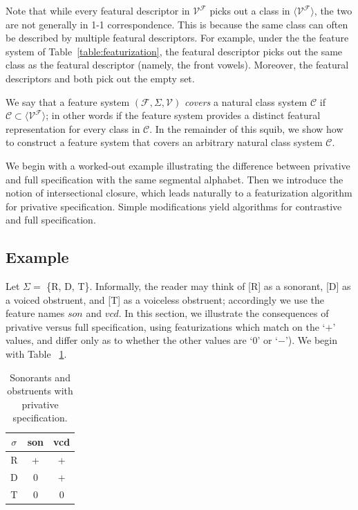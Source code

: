 \documentclass[11pt, oneside]{article}   	%
\begin{document}
Note that while every featural descriptor in $\mathcal V^\mathcal F$ picks out a class in $\langle \mathcal V^\mathcal F \rangle$, the two are not generally in 1-1 correspondence. This is because the same class can often be described by multiple featural descriptors. For example, under the the feature system of Table~\ref{table:featurization}, the featural descriptor  picks out the same class as the featural descriptor  (namely, the front vowels). Moreover, the featural descriptors  and  both pick out the empty set.

\vspace{\baselineskip} We say that a feature system $(\mathcal F, \Sigma, \mathcal V)$ \textit{covers} a natural class system $\mathcal C$ if $\mathcal C \subset \langle \mathcal V^\mathcal F \rangle$; in other words if the feature system provides a distinct featural representation for every class in $\mathcal C$. In the remainder of this squib, we show how to construct a feature system that covers an arbitrary natural class system $\mathcal C$.

We begin with a worked-out example illustrating the difference between privative and full specification with the same segmental alphabet. Then we introduce the notion of intersectional closure, which leads naturally to a featurization algorithm for privative specification. Simple modifications yield algorithms for contrastive and full specification.

\subsection{Example}

Let $\Sigma =$ \{R, D, T\}. Informally, the reader may think of [R] as a sonorant, [D] as a voiced obstruent, and [T] as a voiceless obstruent; accordingly we use the feature names $son$ and $vcd$. In this section, we illustrate the consequences of privative versus full specification, using featurizations which match on the `$+$' values, and differ only as to whether the other values are `$0$' or `$-$'). We begin with Table ~\ref{table:privative}.

\begin{table}[h]
    \centering
    \begin{tabular} {|c||c|c|}
    \hline
        $\sigma$ & son & vcd \\ \hline
        R & + & + \\
        D & 0 & + \\
        T & 0 & 0 \\
        \hline
    \end{tabular}
    \caption{Sonorants and obstruents with privative specification.}
    \label{table:privative}
\end{table}
\end{document}
